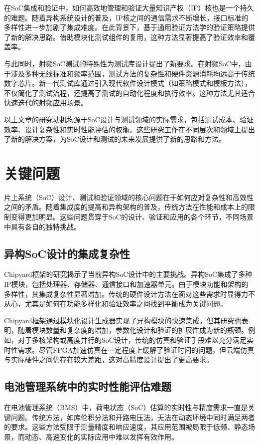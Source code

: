\documentclass[12pt,hyperref,a4paper,UTF8]{ctexart}
\begin{document}
在SoC集成和验证中，如何高效地管理和验证大量知识产权（IP）核也是一个持久的难题。随着异构系统设计的普及，IP核之间的通信需求不断增长，接口标准的多样性进一步加剧了集成难度。在此背景下，基于通用验证方法学的验证策略提供了新的解决思路。借助模块化测试组件的复用，这种方法显著提高了验证效率和覆盖率\cite{9641547}。

与此同时，射频SoC测试的特殊性为测试库设计提出了新要求。在射频SoC中，由于涉及多种无线标准和频率范围，测试方法的复杂性和硬件资源消耗均远高于传统数字芯片。新一代测试库通过引入现代软件设计模式（如策略模式和模板方法），不仅简化了测试流程，还提高了测试的自动化程度和执行效率。这种方法尤其适合快速迭代的射频应用场景\cite{9461580}。

以上文章的研究动机均源于SoC设计与测试领域的实际需求，包括测试成本、验证效率、设计复杂性和实时性能评估的权衡。这些研究工作在不同层次和领域上提出了新的解决方案，为SoC设计和测试的未来发展提供了新的思路和方法。

\section{关键问题}

片上系统（SoC）设计、测试和验证领域的核心问题在于如何应对复杂性和高效性之间的矛盾。随着集成度的提高和异构架构的普及，传统方法在性能和成本上的限制变得更加明显。这些问题贯穿于SoC的设计、验证和应用的各个环节，不同场景中具有各自的独特挑战。

\subsection{异构SoC设计的集成复杂性}
Chipyard框架的研究揭示了当前异构SoC设计中的主要挑战。异构SoC集成了多种IP模块，包括处理器、存储器、通信接口和加速器单元。由于模块功能和架构的多样性，其集成复杂性显著增加。传统的硬件设计方法在面对这些需求时显得力不从心，尤其是如何在功能多样化和验证效率之间找到平衡成为关键问题。

Chipyard框架通过模块化设计生成器实现了异构模块的快速集成，但其研究也表明，随着模块数量和复杂度的增加，参数化设计和验证的扩展性成为新的瓶颈\cite{9099108}。例如，对于多核架构或高度并行的SoC设计，传统的仿真和验证手段难以充分满足实时性需求。尽管FPGA加速仿真在一定程度上缓解了验证时间的问题，但云端仿真与实际硬件之间仍存在较大差距，这对高精度设计提出了更高要求。

\subsection{电池管理系统中的实时性能评估难题}
在电池管理系统（BMS）中，荷电状态（SoC）估算的实时性与精度需求一直是关键问题。传统方法，如库伦积分法和开路电压法，无法在动态环境中同时满足两者的要求。这些方法受限于测量精度和响应速度，其应用范围被局限于低频、静态场景，而动态、高速变化的实际应用中难以发挥有效作用\cite{10227269}。
\end{document}

